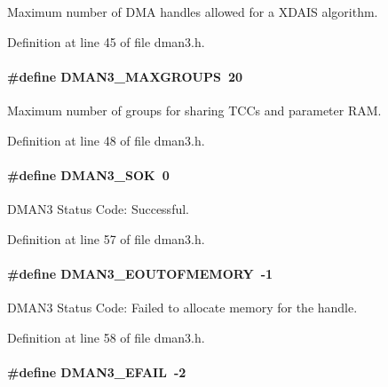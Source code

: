 Maximum number of DMA handles allowed for a XDAIS algorithm. 

Definition at line 45 of file dman3.h.\hypertarget{group___d_s_p_d_m_a_n3_gb4a261c271c8d0f1e9843eada6b263e8}{
\paragraph[DMAN3\_\-MAXGROUPS]{\setlength{\rightskip}{0pt plus 5cm}\#define DMAN3\_\-MAXGROUPS~20}\hfill}
\label{group___d_s_p_d_m_a_n3_gb4a261c271c8d0f1e9843eada6b263e8}


Maximum number of groups for sharing TCCs and parameter RAM. 

Definition at line 48 of file dman3.h.\hypertarget{group___d_s_p_d_m_a_n3_g462d3887266b42b69cf21c65e87dc99d}{
\paragraph[DMAN3\_\-SOK]{\setlength{\rightskip}{0pt plus 5cm}\#define DMAN3\_\-SOK~0}\hfill}
\label{group___d_s_p_d_m_a_n3_g462d3887266b42b69cf21c65e87dc99d}


DMAN3 Status Code: Successful. 

Definition at line 57 of file dman3.h.\hypertarget{group___d_s_p_d_m_a_n3_g70d091dae946805ff49ab47b903483a7}{
\paragraph[DMAN3\_\-EOUTOFMEMORY]{\setlength{\rightskip}{0pt plus 5cm}\#define DMAN3\_\-EOUTOFMEMORY~-1}\hfill}
\label{group___d_s_p_d_m_a_n3_g70d091dae946805ff49ab47b903483a7}


DMAN3 Status Code: Failed to allocate memory for the handle. 

Definition at line 58 of file dman3.h.\hypertarget{group___d_s_p_d_m_a_n3_ge81e9235f9755ac2e6a6279401c8798d}{
\paragraph[DMAN3\_\-EFAIL]{\setlength{\rightskip}{0pt plus 5cm}\#define DMAN3\_\-EFAIL~-2}\hfill}
\label{group___d_s_p_d_m_a_n3_ge81e9235f9755ac2e6a6279401c8798d}


